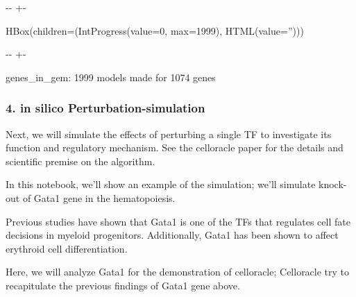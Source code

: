 \documentclass[letterpaper,10pt,english]{sphinxmanual}
\newlength\nbsphinxcodecellspacing
\begin{document}
{

\kern-\sphinxverbatimsmallskipamount\kern-\baselineskip
\kern+\FrameHeightAdjust\kern-\fboxrule
\vspace{\nbsphinxcodecellspacing}

\begin{sphinxVerbatim}[commandchars=\\\{\}]
HBox(children=(IntProgress(value=0, max=1999), HTML(value='')))
\end{sphinxVerbatim}
}

{

\kern-\sphinxverbatimsmallskipamount\kern-\baselineskip
\kern+\FrameHeightAdjust\kern-\fboxrule
\vspace{\nbsphinxcodecellspacing}

\begin{sphinxVerbatim}[commandchars=\\\{\}]

genes\_in\_gem: 1999
models made for 1074 genes
\end{sphinxVerbatim}
}


\subsubsection{4. in silico Perturbation-simulation}
\label{\detokenize{notebooks/05_simulation/Gata1_KO_simulation_with_with_Paul_etal_2015_data:4.-in-silico-Perturbation-simulation}}
Next, we will simulate the effects of perturbing a single TF to investigate its function and regulatory mechanism. See the celloracle paper for the details and scientific premise on the algorithm.

In this notebook, we’ll show an example of the simulation; we’ll simulate knock-out of Gata1 gene in the hematopoiesis.

Previous studies have shown that Gata1 is one of the TFs that regulates cell fate decisions in myeloid progenitors. Additionally, Gata1 has been shown to affect erythroid cell differentiation.

Here, we will analyze Gata1 for the demonstration of celloracle; Celloracle try to recapitulate the previous findings of Gata1 gene above.
\end{document}

